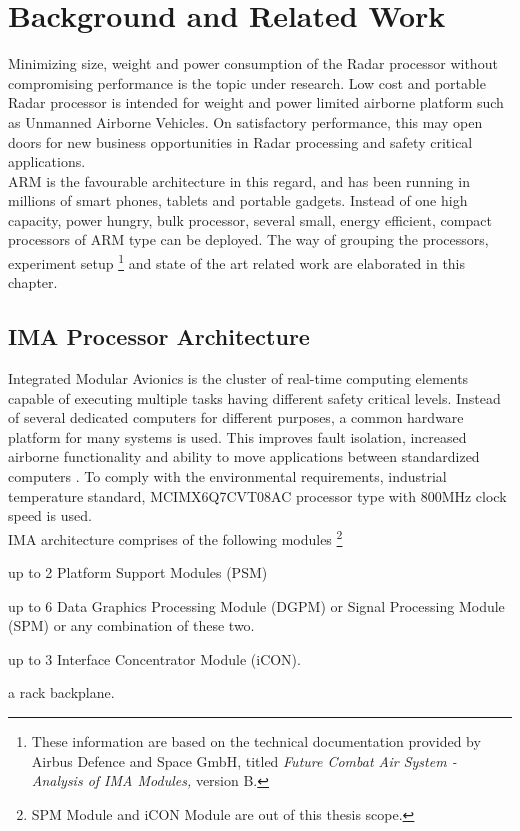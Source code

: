 \chapter{Background and Related Work}
\label{chap:bg_related_work}
Minimizing size, weight and power consumption of the Radar processor without compromising performance is the topic under research. Low cost and portable Radar processor is intended for weight and power limited airborne platform such as Unmanned Airborne Vehicles. On satisfactory performance, this may open doors for new business opportunities in Radar processing and safety critical applications. \\
ARM is the favourable architecture in this regard, and has been running in millions of smart phones, tablets and portable gadgets. Instead of one high capacity, power hungry, bulk processor, several small, energy efficient, compact processors of ARM type can be deployed. The way of grouping the processors, experiment setup \footnote{These information are based on the technical documentation provided by Airbus Defence and Space GmbH, titled \textsl{Future Combat Air System - Analysis of IMA Modules,} version B.} and state of the art related work are elaborated in this chapter.

\section{IMA Processor Architecture} 
\label{sec:bg_related_work:ima}
Integrated Modular Avionics is the cluster of real-time computing elements capable of executing multiple tasks having different safety critical levels. Instead of several dedicated computers for different purposes, a common hardware platform for many systems is used. This improves fault isolation, increased airborne functionality and ability to move applications between standardized computers \cite{theAvionics}. To comply with the environmental requirements, industrial temperature standard, MCIMX6Q7CVT08AC processor type with 800MHz clock speed is used. \\

IMA architecture comprises of the following modules \footnote{SPM Module and iCON Module are out of this thesis scope.}
\begin{compactitem} 
	\item up to 2 Platform Support Modules (PSM) 
	\item up to 6 Data Graphics Processing Module (DGPM) or Signal Processing Module (SPM) or any combination of these two.
	\item up to 3 Interface Concentrator Module (iCON).
	\item a rack backplane.
\end{compactitem}

